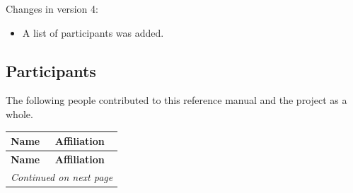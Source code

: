 \documentclass[fleqn,a4paper,oneside,openany]{book}
\begin{document}
Changes in version 4:
\begin{itemize}
    \item A list of participants was added.
\end{itemize}

\subsection*{Participants}
The following people contributed to this reference manual and the project as a whole.

\begin{longtable}{p{4cm}p{10cm}}

\toprule
\textbf{Name} & \textbf{Affiliation} \\
\midrule
\endfirsthead

\toprule
\textbf{Name} & \textbf{Affiliation} \\
\midrule
\endhead

\bottomrule
\multicolumn{2}{r}{\textit{Continued on next page}}
\endfoot


\end{longtable}
\end{document}
